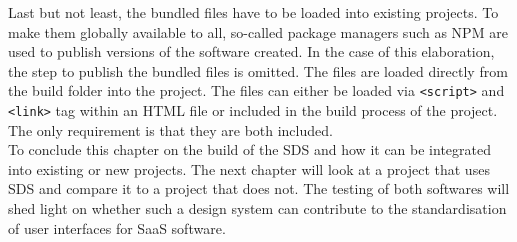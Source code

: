 Last but not least, the bundled files have to be loaded into existing projects. To make them globally available to all, so-called package managers such as NPM are used to publish versions of the software created. In the case of this elaboration, the step to publish the bundled files is omitted. The files are loaded directly from the build folder into the project. The files can either be loaded via \texttt{<script>} and \texttt{<link>} tag within an HTML file or included in the build process of the project. The only requirement is that they are both included. \\
To conclude this chapter on the build of the SDS and how it can be integrated into existing or new projects. The next chapter will look at a project that uses SDS and compare it to a project that does not. The testing of both softwares will shed light on whether such a design system can contribute to the standardisation of user interfaces for SaaS software. 
